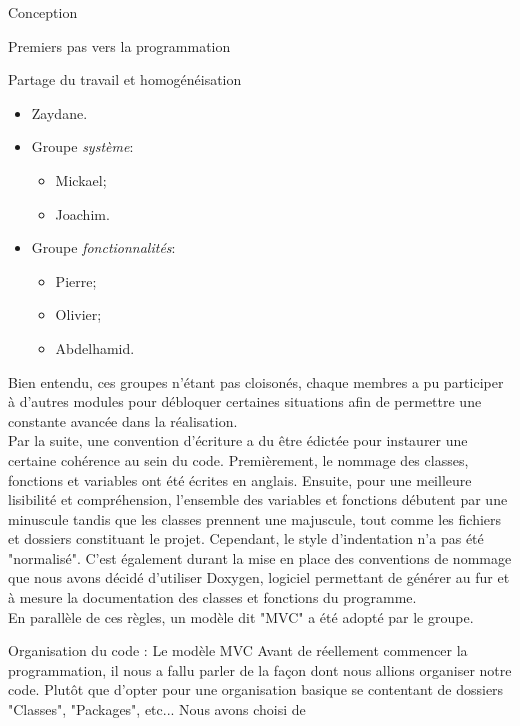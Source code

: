 \documentclass[a4paper, 12pt]{report}
\begin{document}
\begin{part}{Conception}
\begin{chapter}{Premiers pas vers la programmation}
\begin{section}{Partage du travail et homogénéisation}
\begin{itemize}
\begin{itemize}
							\item Zaydane.
						\end{itemize}
				\end{itemize}
				\begin{itemize}
					\item Groupe \emph{système}:
					\begin{itemize}
						\item Mickael;
						\item Joachim.
					\end{itemize}
				\end{itemize}
				\begin{itemize}
					\item Groupe \emph{fonctionnalités}:
					\begin{itemize}
						\item Pierre;
						\item Olivier;
						\item Abdelhamid.
					\end{itemize}
				\end{itemize}
				Bien entendu, ces groupes n'étant pas cloisonés, chaque membres a pu participer à d'autres modules pour débloquer certaines
				situations afin de permettre une constante avancée dans la réalisation.\\
				Par la suite, une convention d'écriture a du être édictée pour instaurer une certaine cohérence au sein du code.
				Premièrement, le nommage des classes, fonctions et variables ont été écrites en anglais. 
				Ensuite, pour une meilleure lisibilité et compréhension, l'ensemble des variables et fonctions débutent par une minuscule tandis
				que les classes prennent une majuscule, tout comme les fichiers et dossiers constituant le projet.
				Cependant, le style d'indentation n'a pas été "normalisé". C'est également durant la mise en place des conventions de
				nommage que nous avons décidé d'utiliser Doxygen, logiciel permettant de générer au fur et à mesure la documentation des classes
				et fonctions du programme.\\
				En parallèle de ces règles, un modèle dit "MVC" a été adopté par le groupe.\\
			\end{section}
			\begin{section}{Organisation du code : Le modèle MVC}
				Avant de réellement commencer la programmation, il nous a fallu parler de la façon dont nous allions organiser notre code.
				Plutôt que d'opter pour une organisation basique se contentant de dossiers "Classes", "Packages", etc... Nous avons choisi de 

\end{section}
\end{chapter}
\end{part}
\end{document}
